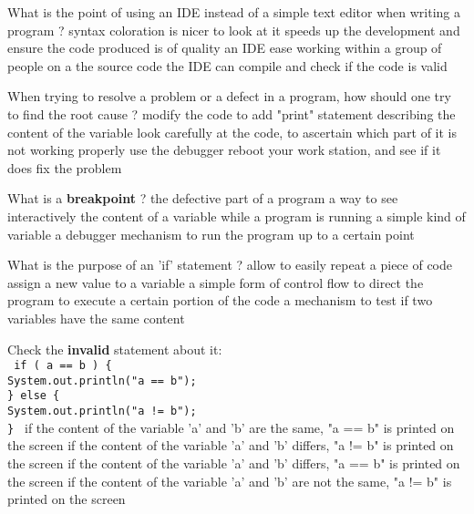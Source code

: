
\begin{question}{
What is the point of using an IDE instead of a simple text editor when writing a program ?
}
  \false syntax coloration is nicer to look at
  \true  it speeds up the development and ensure the code produced is of quality
  \false an IDE ease working within a group of people on a the source code
  \false the IDE can compile and check if the code is valid
\end{question}

\begin{question}{
When trying to resolve a problem or a defect in a program, how should one try to find the root cause ?
}
  \false modify the code to add "print" statement describing the content of the variable
  \false look carefully at the code, to ascertain which part of it is not working properly
  \true use the debugger
  \false reboot your work station, and see if it does fix the problem
\end{question}

\begin{question}{
What is a \textbf{breakpoint} ?
}
  \false the defective part of a program
  \false a way to see interactively the content of a variable while a program is running
  \false a simple kind of variable
  \true a debugger mechanism to run the program up to a certain point
\end{question}

\begin{question}{
What is the purpose of an 'if' statement ?
}
  \false allow to easily repeat a piece of code
  \false assign a new value to a variable
  \true a simple form of control flow to direct the program to execute a certain portion of the code
  \false a mechanism to test if two variables have the same content
\end{question}

\begin{question}{
Check the \textbf{invalid} statement about it:\\
\small{
  \texttt{
    if ( a == b ) \{ \\
      \vspace{4pt} System.out.println("a == b"); \\
    \} else \{  \\
      \vspace{4pt} System.out.println("a != b");  \\
    \}
  }
}
}
  \false if the content of the variable 'a' and 'b' are the same, "a == b" is printed on the screen
  \false if the content of the variable 'a' and 'b' differs, "a != b" is printed on the screen
  \true if the content of the variable 'a' and 'b' differs, "a == b" is printed on the screen
  \false if the content of the variable 'a' and 'b' are not the same, "a != b" is printed on the screen
\end{question}


